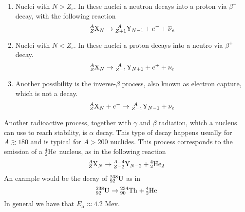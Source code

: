 \documentclass[../qm.tex]{subfiles}
\begin{document}
\begin{enumerate}
\item Nuclei with $N>Z_s$. In these nuclei a neutron decays into a proton via $\beta^-$ decay, with the following reaction
	\begin{equation}
		\nuc[N]{X}{A}{Z}\to\nuc[N-1]{Y}{\ A}{Z+1}+e^-+\overline{\nu}_e
		\label{eq:betaminusdecay}
	\end{equation}
\item Nuclei with $N<Z_s$. In these nuclei a proton decays into a neutro via $\beta^+$ decay.
	\begin{equation}
		\nuc[N]{X}{A}{Z}\to\nuc[N+1]{Y}{\ A}{Z-1}+e^++\nu_e
		\label{eq:betaplusdecay}
	\end{equation}
\item Another possibility is the inverse-$\beta$ process, also known as electron capture, which is not a decay.
	\begin{equation}
		\nuc[N]{X}{A}{Z}+e^-\to\nuc[N-1]{Y}{\ A}{Z-1}+\nu_e
		\label{eq:ecapture}
	\end{equation}
\end{enumerate}
Another radioactive process, together with $\gamma$ and $\beta$ radiation, which a nucleus can use to reach stability, is $\alpha$ decay. This type of decay happens usually for $A\gtrsim180$ and is typical for $A>200$ nuclides. This process corresponds to the emission of a $\nuc{He}{4}{2}$ nucleus, as in the following reaction
\begin{equation}
	\nuc[N]{X}{A}{Z}\to\nuc[N-2]{Y}{A-4}{Z-2}+\nuc[2]{He}{4}{2}
	\label{eq:alphadecay}
\end{equation}
An example would be the decay of $\nuc{U}{238}{92}$ as in
\begin{equation*}
	\nuc{U}{238}{92}\to\nuc{Th}{234}{90}+\nuc{He}{4}{2}
\end{equation*}
In general we have that $E_\alpha\approx4.2$ Mev.
\end{document}
